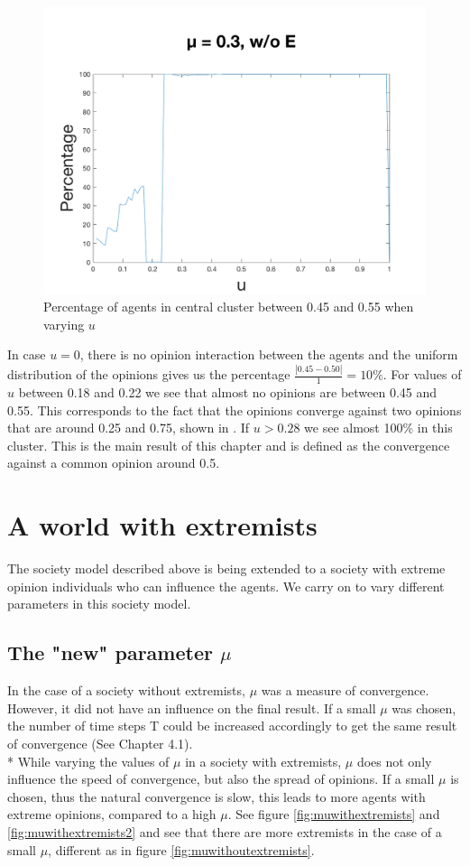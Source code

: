 \documentclass[11pt]{article}
\begin{document}
\begin{figure}[!htb]
\center
  \includegraphics[width=0.7\linewidth]{gen_plot_intervall_2017121816214390840e+01.png}
  \caption{Percentage of agents in central cluster between 0.45 and 0.55 when varying $u$}
  \label{fig:uwithoutextremists}
\end{figure}

In case $u = 0$, there is no opinion interaction between the agents and the uniform distribution of the opinions gives us the percentage $\frac{|0.45-0.50|}{1} = 10\%$. For values of $u$ between 0.18 and 0.22 we see that almost no opinions are between 0.45 and 0.55. This corresponds to the fact that the opinions converge against two opinions that are around 0.25 and 0.75, shown in \cite{Minor}. If $u > 0.28$ we see almost 100\% in this cluster. This is the main result of this chapter and is defined as the convergence against a common opinion around 0.5.

\section{A world with extremists}
The society model described above is being extended to a society with extreme opinion individuals who can influence the agents. We carry on to vary different parameters in this society model.

\subsection{The "new" parameter \texorpdfstring{$\mu$}{TEXT}}
In the case of a society without extremists, $\mu$ was a measure of convergence. However, it did not have an influence on the final result. If a small $\mu$ was chosen, the number of time steps T could be increased accordingly to get the same result of convergence (See Chapter 4.1). \\*
While varying the values of $\mu$ in a society with extremists, $\mu$ does not only influence the speed of convergence, but also the spread of opinions. If a small $\mu$ is chosen, thus the natural convergence is slow, this leads to more agents with extreme opinions, compared to a high $\mu$. See figure \ref{fig:muwithextremists} and \ref{fig:muwithextremists2} and see that there are more extremists in the case of a small $\mu$, different as in figure  \ref{fig:muwithoutextremists}.
\end{document}
